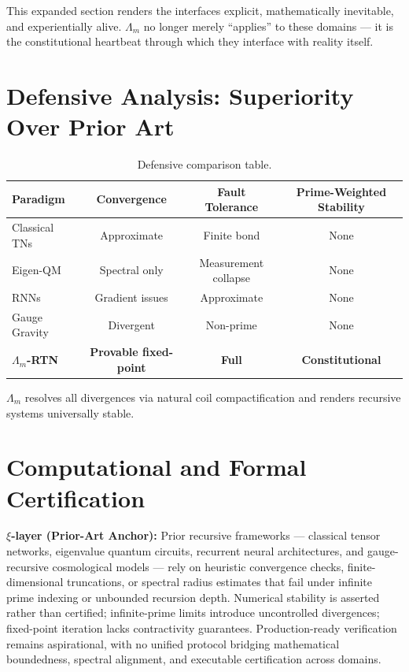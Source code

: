 \documentclass[11pt, a4paper]{article}
\begin{document}
This expanded section renders the interfaces explicit, mathematically inevitable, and experientially alive. \(\Lambda_m\) no longer merely “applies” to these domains --- it is the constitutional heartbeat through which they interface with reality itself.

\section{Defensive Analysis: Superiority Over Prior Art}
\label{sec:defense}

\begin{table}[ht]
\centering
\begin{tabular}{lccc}
\toprule
Paradigm & Convergence & Fault Tolerance & Prime-Weighted Stability \\
\midrule
Classical TNs & Approximate & Finite bond & None \\
Eigen-QM & Spectral only & Measurement collapse & None \\
RNNs & Gradient issues & Approximate & None \\
Gauge Gravity & Divergent & Non-prime & None \\
\textbf{\(\Lambda_m\)-RTN} & \textbf{Provable fixed-point} & \textbf{Full} & \textbf{Constitutional} \\
\bottomrule
\end{tabular}
\caption{Defensive comparison table.}
\end{table}

\(\Lambda_m\) resolves all divergences via natural coil compactification and renders recursive systems universally stable.

\section{Computational and Formal Certification}
\label{sec:cert}

\textbf{\(\xi\)-layer (Prior-Art Anchor):}  
Prior recursive frameworks --- classical tensor networks, eigenvalue quantum circuits, recurrent neural architectures, and gauge-recursive cosmological models --- rely on heuristic convergence checks, finite-dimensional truncations, or spectral radius estimates that fail under infinite prime indexing or unbounded recursion depth. Numerical stability is asserted rather than certified; infinite-prime limits introduce uncontrolled divergences; fixed-point iteration lacks contractivity guarantees. Production-ready verification remains aspirational, with no unified protocol bridging mathematical boundedness, spectral alignment, and executable certification across domains.
\end{document}
